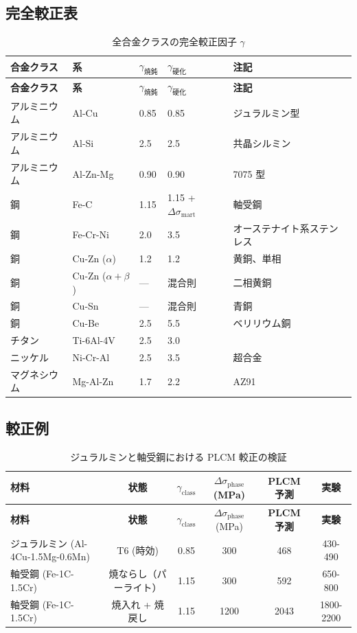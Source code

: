 \documentclass[11pt,a4paper]{article}
\theoremstyle{remark}
\begin{document}
	\subsection{完全較正表}
	\label{subsec:complete-calibration}
	
	\begin{longtable}{p{3cm}p{2.5cm}p{2.5cm}p{2.5cm}p{4cm}}
		\caption{全合金クラスの完全較正因子 \(\gamma\)} \label{tab:complete-gamma} \\
		\toprule
		\textbf{合金クラス} & \textbf{系} & \(\gamma_{\text{焼鈍}}\) & \(\gamma_{\text{硬化}}\) & \textbf{注記} \\
		\midrule
		\endfirsthead
		\toprule
		\textbf{合金クラス} & \textbf{系} & \(\gamma_{\text{焼鈍}}\) & \(\gamma_{\text{硬化}}\) & \textbf{注記} \\
		\midrule
		\endhead
		アルミニウム & Al-Cu & 0.85 & 0.85 & ジュラルミン型 \\
		アルミニウム & Al-Si & 2.5 & 2.5 & 共晶シルミン \\
		アルミニウム & Al-Zn-Mg & 0.90 & 0.90 & 7075 型 \\
		鋼 & Fe-C & 1.15 & 1.15 + \(\Delta\sigma_{\text{mart}}\) & 軸受鋼 \\
		鋼 & Fe-Cr-Ni & 2.0 & 3.5 & オーステナイト系ステンレス \\
		銅 & Cu-Zn (\(\alpha\)) & 1.2 & 1.2 & 黄銅、単相 \\
		銅 & Cu-Zn (\(\alpha+\beta\)) & — & 混合則 & 二相黄銅 \\
		銅 & Cu-Sn & — & 混合則 & 青銅 \\
		銅 & Cu-Be & 2.5 & 5.5 & ベリリウム銅 \\
		チタン & Ti-6Al-4V & 2.5 & 3.0 & \\
		ニッケル & Ni-Cr-Al & 2.5 & 3.5 & 超合金 \\
		マグネシウム & Mg-Al-Zn & 1.7 & 2.2 & AZ91 \\
		\bottomrule
	\end{longtable}
	
	\subsection{較正例}
	
	\begin{longtable}{lccccc}
		\caption{ジュラルミンと軸受鋼における PLCM 較正の検証} \label{tab:calibration-validation} \\
		\toprule
		\textbf{材料} & \textbf{状態} & \(\gamma_{\text{class}}\) & \(\Delta\sigma_{\text{phase}}\) (MPa) & \textbf{PLCM 予測} & \textbf{実験} \\
		\midrule
		\endfirsthead
		\toprule
		\textbf{材料} & \textbf{状態} & \(\gamma_{\text{class}}\) & \(\Delta\sigma_{\text{phase}}\) (MPa) & \textbf{PLCM 予測} & \textbf{実験} \\
		\midrule
		\endhead
		ジュラルミン (Al-4Cu-1.5Mg-0.6Mn) & T6 (時効) & 0.85 & 300 & 468 & 430-490 \\
		軸受鋼 (Fe-1C-1.5Cr) & 焼ならし（パーライト） & 1.15 & 300 & 592 & 650-800 \\
		軸受鋼 (Fe-1C-1.5Cr) & 焼入れ + 焼戻し & 1.15 & 1200 & 2043 & 1800-2200 \\
		\bottomrule
	\end{longtable}
	
\end{document}
